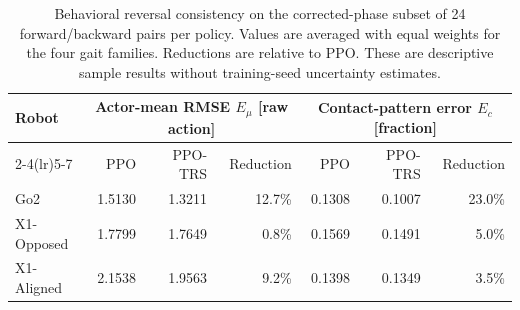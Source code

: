 \begin{table}[t]
    \centering
    \small
    \setlength{\tabcolsep}{6pt}
    \renewcommand{\arraystretch}{1.15}
    \caption{Behavioral reversal consistency on the corrected-phase subset of 24 forward/backward pairs per policy. Values are averaged with equal weights for the four gait families. Reductions are relative to PPO. These are descriptive sample results without training-seed uncertainty estimates.}
    \label{tab:loco_reversal_statistics}
    \begin{tabular}{@{}lrrrrrr@{}}
        \toprule
        \multirow{2}{*}{Robot} & \multicolumn{3}{c}{Actor-mean RMSE $E_\mu$ [raw action]} & \multicolumn{3}{c}{Contact-pattern error $E_c$ [fraction]} \\
        \cmidrule(lr){2-4}\cmidrule(lr){5-7}
        & PPO & PPO-TRS & Reduction & PPO & PPO-TRS & Reduction \\
        \midrule
        Go2 & 1.5130 & 1.3211 & 12.7\% & 0.1308 & 0.1007 & 23.0\% \\
        X1-Opposed & 1.7799 & 1.7649 & 0.8\% & 0.1569 & 0.1491 & 5.0\% \\
        X1-Aligned & 2.1538 & 1.9563 & 9.2\% & 0.1398 & 0.1349 & 3.5\% \\
        \bottomrule
    \end{tabular}
\end{table}

